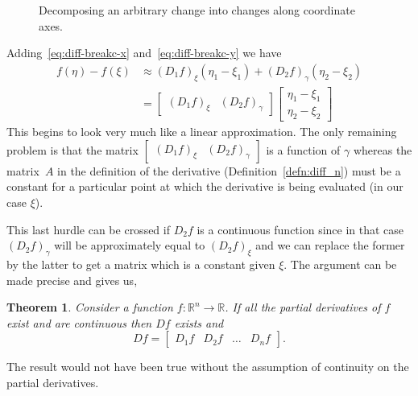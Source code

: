 \documentclass[11pt,reqno,openany]{amsbook}
\numberwithin{figure}{chapter}
\numberwithin{equation}{chapter}
\theoremstyle{plain}
\newtheorem{thm}{Theorem}[chapter]
\theoremstyle{definition}
\renewcommand{\Re}{\mathbb{R}}
\begin{document}
\begin{figure}
  \caption{Decomposing an arbitrary change into changes along coordinate axes.}
  \label{fig:diff-break-change}
\end{figure}

Adding~\eqref{eq:diff-breakc-x} and~\eqref{eq:diff-breakc-y}
we have
\begin{align*}
  f(\eta)-f(\xi) &\approx (D_1 f)_\xi(\eta_1-\xi_1) 
  + (D_2 f)_\gamma (\eta_2-\xi_2)\\
  &=\begin{bmatrix} (D_1 f)_\xi & (D_2 f)_\gamma \end{bmatrix}
  \begin{bmatrix} \eta_1-\xi_1 \\ \eta_2-\xi_2 \end{bmatrix}
\end{align*}
This begins to look very much like a linear approximation.
The only remaining problem is that the matrix
$\begin{bmatrix} (D_1 f)_\xi & (D_2 f)_\gamma \end{bmatrix}$
is a function of $\gamma$ whereas the matrix~$A$ in the
definition of the derivative (Definition~\ref{defn:diff_n})
must be a constant for a particular point at which the
derivative is being evaluated (in our case $\xi$). 

This last hurdle can be crossed if $D_2 f$ is a continuous
function since in that case $(D_2 f)_\gamma$ will be
approximately equal to $(D_2 f)_\xi$ and we can replace the
former by the latter to get a matrix which is a constant
given $\xi$. The argument can be made precise and gives us,

\begin{thm}
  Consider a function $f\colon \Re^n \to \Re$. If all the
  partial derivatives of $f$ exist and are continuous then
  $Df$ exists and
  \[Df = \begin{bmatrix} 
    D_1 f & D_2 f & \hdots & D_n f
    \end{bmatrix}.\]
\end{thm}
The result would not have been true without the assumption
of continuity on the partial derivatives.
\end{document}
